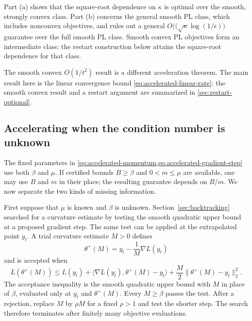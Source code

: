 \documentclass[11pt,twoside]{article}
\theoremstyle{definition}
\theoremstyle{remark}
\begin{document}
Part (a) shows that the square-root dependence on $\kappa$ is optimal over
the smooth, strongly convex class. Part (b) concerns the general smooth PL
class, which includes nonconvex objectives, and rules out a general
$O(\bigl(\sqrt\kappa\log(1/\epsilon)\bigr)$ guarantee over the full smooth PL
class. Smooth convex PL objectives form an intermediate class: the restart
construction below attains the square-root dependence for that class.

The smooth convex $O(1/t^2)$ result is a different acceleration theorem. The
main result here is the linear convergence bound
\cref{eq:accelerated-linear-rate}; the smooth convex result and a restart
argument are summarized in \cref{sec:restart-optional}.

\subsection{Accelerating when the condition number is unknown}

The fixed parameters in
\cref{eq:accelerated-momentum,eq:accelerated-gradient-step} use both $\beta$
and $\mu$. If certified bounds $B\ge\beta$ and $0<m\le\mu$ are available,
one may use $B$ and $m$ in their place; the resulting guarantee depends on
$B/m$. We now separate the two kinds of missing information.

First suppose that $\mu$ is known and $\beta$ is unknown. Section~\ref{sec:backtracking}
searched for a curvature estimate by testing the smooth quadratic upper bound
at a proposed gradient step. The same test can be applied at the extrapolated
point $y_t$. A trial curvature estimate $M>0$ defines
\begin{equation}
 \theta^+(M)=y_t-\frac1M\nabla L(y_t)
 \label{eq:accelerated-trial-step}
\end{equation}
and is accepted when
\begin{equation}
 L(\theta^+(M))
 \le L(y_t)+\langle\nabla L(y_t),\theta^+(M)-y_t\rangle
       +\frac{M}{2}\|\theta^+(M)-y_t\|_2^2.
 \label{eq:accelerated-model-test}
\end{equation}
The acceptance inequality is the smooth quadratic upper bound with $M$ in
place of $\beta$, evaluated only at $y_t$ and $\theta^+(M)$. Every
$M\ge\beta$ passes the test. After a rejection, replace $M$ by $\rho M$ for a
fixed $\rho>1$ and test the shorter step. The search therefore terminates
after finitely many objective evaluations.
\end{document}
